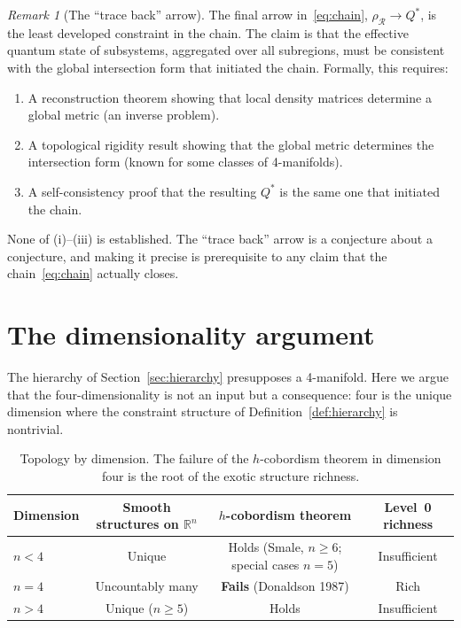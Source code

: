\documentclass[12pt,a4paper]{article}
\theoremstyle{definition}
\theoremstyle{remark}
\newtheorem{remark}{Remark}
\begin{document}
\begin{remark}[The ``trace back'' arrow]
\label{rem:traceback}
The final arrow in~\eqref{eq:chain}, $\rho_\mathcal{R} \to Q^*$, is the least
developed constraint in the chain. The claim is that the effective quantum state
of subsystems, aggregated over all subregions, must be consistent with the
global intersection form that initiated the chain. Formally, this requires:
\begin{enumerate}
\item[(i)] A reconstruction theorem showing that local density matrices
determine a global metric (an inverse problem).
\item[(ii)] A topological rigidity result showing that the global metric
determines the intersection form (known for some classes of 4-manifolds).
\item[(iii)] A self-consistency proof that the resulting $Q^*$ is the same one
that initiated the chain.
\end{enumerate}
None of (i)--(iii) is established. The ``trace back'' arrow is a conjecture
about a conjecture, and making it precise is prerequisite to any claim that the
chain~\eqref{eq:chain} actually closes.
\end{remark}

\section{The dimensionality argument}
\label{sec:dimensionality}

The hierarchy of Section~\ref{sec:hierarchy} presupposes a 4-manifold. Here
we argue that the four-dimensionality is not an input but a consequence: four
is the unique dimension where the constraint structure of
Definition~\ref{def:hierarchy} is nontrivial.

\begin{table}[h]
\centering
\begin{tabular}{lccc}
\toprule
Dimension & Smooth structures on $\mathbb{R}^n$ & $h$-cobordism theorem & Level~0 richness \\
\midrule
$n < 4$ & Unique & Holds (Smale, $n \geq 6$; special cases $n = 5$) & Insufficient \\
$n = 4$ & Uncountably many & \textbf{Fails} (Donaldson 1987) & Rich \\
$n > 4$ & Unique ($n \geq 5$) & Holds & Insufficient \\
\bottomrule
\end{tabular}
\caption{Topology by dimension. The failure of the $h$-cobordism theorem in
dimension four is the root of the exotic structure richness.}
\label{tab:dimensions}
\end{table}
\end{document}
